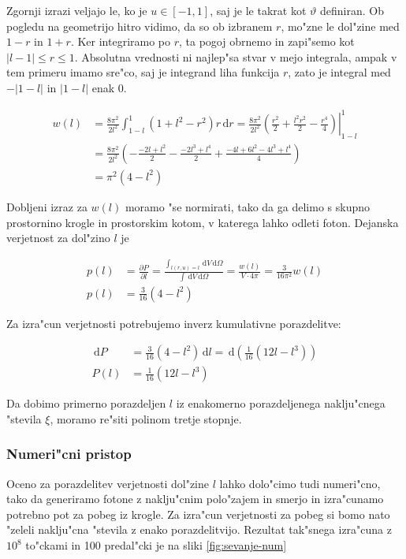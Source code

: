 \documentclass[a4paper,10pt]{article}
\renewcommand{\theta}{\vartheta}
\newcommand{\dd}{\,\mathrm{d}}
\begin{document}
Zgornji izrazi veljajo le, ko je $u\in[-1,1]$, saj je le takrat kot $\theta$ definiran. Ob pogledu na geometrijo hitro vidimo, da so ob izbranem $r$, mo"zne le dol"zine med $1-r$ in $1+r$. Ker integriramo po $r$, ta pogoj obrnemo in zapi"semo kot $|l-1|\leq r \leq 1$. Absolutna vrednosti ni najlep"sa stvar v mejo integrala, ampak v tem primeru imamo sre"co, saj je integrand liha funkcija $r$, zato je integral med $-|1-l|$ in $|1-l|$ enak 0.
 
\begin{align}
 w(l) &= \frac{8\pi^2}{2l^2}\int_{1-l}^1 (1 + l^2 - r^2 ) r \dd r = \frac{8\pi^2}{2l^2} \left.\left(\frac{r^2}{2} + \frac{l^2r^2}{2} - \frac{r^4}{4}\right)\right|_{1-l}^{1} \\
&= \frac{8\pi^2}{2l^2} \left( - \frac{-2l+l^2}{2} - \frac{-2l^3+l^4}{2} + \frac{-4l+6l^2 - 4l^3 + l^4}{4}\right) \\
&= \pi^2(4 - l^2)
\end{align}

Dobljeni izraz za $w(l)$ moramo "se normirati, tako da ga delimo s skupno prostornino krogle in prostorskim kotom, v katerega lahko odleti foton. Dejanska verjetnost za dol"zino $l$ je 

\begin{align}
 p(l) &= \frac{\partial P}{\partial l} = \frac{\int_{l(r,u)=l} \dd V \dd \Omega}{\int \dd V \dd \Omega} = \frac{w(l)}{ V \cdot 4\pi } = \frac{3}{16\pi^2}w(l)\\
p(l) &= \frac{3}{16} (4-l^2)
\end{align}

Za izra"cun verjetnosti potrebujemo inverz kumulativne porazdelitve:

\begin{align}
 \dd P &= \frac{3}{16} (4-l^2) \dd l = \dd \left( \frac{1}{16}(12l - l^3) \right) \\
  P(l) &= \frac{1}{16}(12l - l^3)
\end{align}

Da dobimo primerno porazdeljen $l$ iz enakomerno porazdeljenega naklju"cnega "stevila $\xi$, moramo re"siti polinom tretje stopnje. 

\clearpage

\subsubsection{Numeri"cni pristop}
Oceno za porazdelitev verjetnosti dol"zine $l$ lahko dolo"cimo tudi numeri"cno, tako da generiramo fotone z naklju"cnim polo"zajem in smerjo in izra"cunamo potrebno pot za pobeg iz krogle. Za izra"cun verjetnosti za pobeg si bomo nato "zeleli naklju"cna "stevila z enako porazdelitvijo. Rezultat tak"snega izra"cuna z $10^8$ to"ckami in 100 predal"cki je na sliki \ref{fig:sevanje-num}
\end{document}
